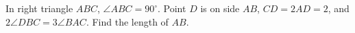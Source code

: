In right triangle $ABC$, $\angle ABC=90^\circ$. Point $D$ is on side $AB$, $CD=2AD=2$, and $2\angle DBC=3\angle BAC$. Find the length of $AB$.
